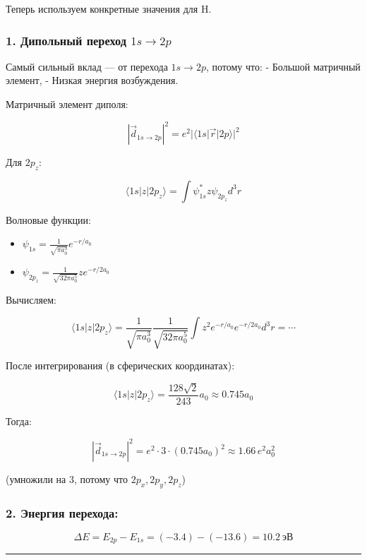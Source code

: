 \documentclass[11pt]{article}
\providecommand{\tightlist}{%
      \setlength{\itemsep}{0pt}\setlength{\parskip}{0pt}}
\begin{document}
Теперь используем конкретные значения для H.

\subsubsection{\texorpdfstring{1. Дипольный переход
\(1s \to 2p\)}{1. Дипольный переход 1s \textbackslash{}to 2p}}\label{ux434ux438ux43fux43eux43bux44cux43dux44bux439-ux43fux435ux440ux435ux445ux43eux434-1s-to-2p}

Самый сильный вклад --- от перехода \(1s \to 2p\), потому что: - Большой
матричный элемент, - Низкая энергия возбуждения.

Матричный элемент диполя:

\[
|\vec{d}_{1s \to 2p}|^2 = e^2 |\langle 1s| \vec{r} |2p \rangle|^2
\]

Для \(2p_z\):

\[
\langle 1s| z |2p_z \rangle = \int \psi_{1s}^* z \psi_{2p_z} d^3r
\]

Волновые функции:

\begin{itemize}
\tightlist
\item
  \(\psi_{1s} = \frac{1}{\sqrt{\pi a_0^3}} e^{-r/a_0}\)
\item
  \(\psi_{2p_z} = \frac{1}{\sqrt{32\pi a_0^5}} z e^{-r/2a_0}\)
\end{itemize}

Вычисляем:

\[
\langle 1s| z |2p_z \rangle = \frac{1}{\sqrt{\pi a_0^3}} \frac{1}{\sqrt{32\pi a_0^5}} \int z^2 e^{-r/a_0} e^{-r/2a_0} d^3r = \cdots
\]

После интегрирования (в сферических координатах):

\[
\langle 1s| z |2p_z \rangle = \frac{128\sqrt{2}}{243} a_0 \approx 0.745 a_0
\]

Тогда:

\[
|\vec{d}_{1s\to2p}|^2 = e^2 \cdot 3 \cdot (0.745 a_0)^2 \approx 1.66\, e^2 a_0^2
\]

(умножили на 3, потому что \(2p_x, 2p_y, 2p_z\))

\subsubsection{2. Энергия
перехода:}\label{ux44dux43dux435ux440ux433ux438ux44f-ux43fux435ux440ux435ux445ux43eux434ux430}

\[
\Delta E = E_{2p} - E_{1s} = (-3.4) - (-13.6) = 10.2~\text{эВ}
\]

\begin{center}\rule{0.5\linewidth}{\linethickness}\end{center}
\end{document}
